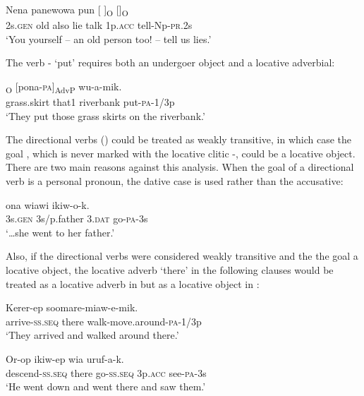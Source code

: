 \ea%
\label{ex:3:x943}
\gll Nena panewowa pun [ ]\textsubscript{O}  []\textsubscript{O}  \\
2s.\textsc{gen} old also lie talk 1p.\textsc{acc} tell-Np-\textsc{pr}.2s\\
\glt`You yourself -- an old person too! -- tell us lies.'
\z

The verb - `put' requires both an undergoer object and a locative adverbial: 

\ea%
\label{ex:3:x1837}
\textsubscript{O} [pona-\textsc{pa}]\textsubscript{AdvP} wu-a-mik. \\
grass.skirt that1 riverbank put-\textsc{pa}-1/3p\\
\glt`They put those grass skirts on the riverbank.'
\z

The directional verbs () could be treated as weakly transitive, in which case the goal , which is never marked with the locative clitic -, could be a locative object. There are two main reasons against this analysis. When the goal of a directional verb is a personal pronoun, the dative case is used rather than the accusative:

\ea%
\label{ex:3:x1870}
\gll {\dots}ona wiawi  ikiw-o-k. \\
3s.\textsc{gen} 3s/p.father 3.\textsc{dat} go-\textsc{pa}-3s\\
\glt`{\dots}she went to her father.'
\z

Also, if the directional verbs were considered weakly transitive and the the goal a locative object, the locative adverb  `there' in the following clauses would be treated as a locative adverb in  but as a locative object in :

\ea%
\label{ex:3:x1871}
\gll Kerer-ep  soomare-miaw-e-mik. \\
arrive-\textsc{ss}.\textsc{seq} there walk-move.around-\textsc{pa}-1/3p\\
\glt`They arrived and walked around there.'
\z

\ea%
\label{ex:3:x1872}
\gll Or-op  ikiw-ep wia uruf-a-k. \\
descend-\textsc{ss}.\textsc{seq} there go-\textsc{ss}.\textsc{seq} 3p.\textsc{acc} see-\textsc{pa}-3s\\
\glt`He went down and went there and saw them.'
\z

